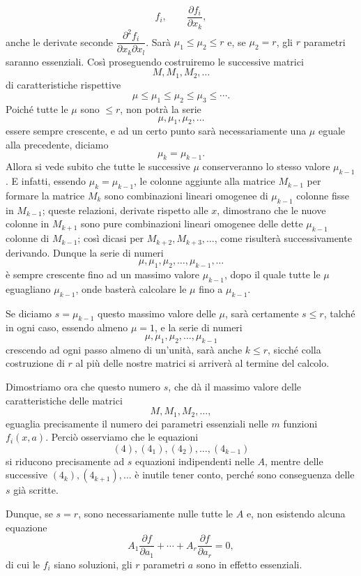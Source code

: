 \documentclass[11pt]{book}
\begin{document}
\[
 f_i,\qquad \frac{\partial f_i}{\partial x_k},
\]
anche le derivate seconde $\dfrac{\partial^2 f_i}{\partial x_k\partial x_l}$. Sarà $\mu_1\le\mu_2\le r$ e, se $\mu_2=r$, gli $r$ parametri saranno essenziali. Così proseguendo costruiremo le successive matrici
\[
 M,
 M_1,
 M_2,
 \ldots
\]
di caratteristiche rispettive
\[
 \mu\le\mu_1\le\mu_2\le\mu_3\le\cdots .
\]
Poiché tutte le $\mu$ sono $\le r$, non potrà la serie
\[
 \mu,\mu_1,\mu_2,\ldots
\]
essere sempre crescente, e ad un certo punto sarà necessariamente una $\mu$ eguale alla precedente, diciamo
\[
 \mu_k=\mu_{k-1}.
\]
Allora si vede subito che tutte le successive $\mu$ conserveranno lo stesso valore $\mu_{k-1}$. E infatti, essendo $\mu_k=\mu_{k-1}$, le colonne aggiunte alla matrice $M_{k-1}$ per formare la matrice $M_k$ sono combinazioni lineari omogenee di $\mu_{k-1}$ colonne fisse in $M_{k-1}$; queste relazioni, derivate rispetto alle $x$, dimostrano che le nuove colonne in $M_{k+1}$ sono pure combinazioni lineari omogenee delle dette $\mu_{k-1}$ colonne di $M_{k-1}$; così dicasi per $M_{k+2},M_{k+3},\ldots$, come risulterà successivamente derivando. Dunque la serie di numeri
\[
 \mu,\mu_1,\mu_2,\ldots,\mu_{k-1},\ldots
\]
è sempre crescente fino ad un massimo valore $\mu_{k-1}$, dopo il quale tutte le $\mu$ eguagliano $\mu_{k-1}$, onde basterà calcolare le $\mu$ fino a $\mu_{k-1}$.

Se diciamo $s=\mu_{k-1}$ questo massimo valore delle $\mu$, sarà certamente $s\le r$, talché in ogni caso, essendo almeno $\mu=1$, e la serie di numeri
\[
 \mu,\mu_1,\mu_2,\ldots,\mu_{k-1}
\]
crescendo ad ogni passo almeno di un'unità, sarà anche $k\le r$, sicché colla costruzione di $r$ al più delle nostre matrici si arriverà al termine del calcolo.

Dimostriamo ora che questo numero $s$, che dà il massimo valore delle caratteristiche delle matrici
\[
 M,M_1,M_2,\ldots,
\]
eguaglia precisamente il numero dei parametri essenziali nelle $m$ funzioni $f_i(x,a)$. Perciò osserviamo che le equazioni
\[
 (4),(4_1),(4_2),\ldots,(4_{k-1})
\]
si riducono precisamente ad $s$ equazioni indipendenti nelle $A$, mentre delle successive $(4_k),(4_{k+1}),\ldots$ è inutile tener conto, perché sono conseguenza delle $s$ già scritte.

Dunque, se $s=r$, sono necessariamente nulle tutte le $A$ e, non esistendo alcuna equazione
\[
 A_1\frac{\partial f}{\partial a_1}+\cdots+A_r\frac{\partial f}{\partial a_r}=0,
\]
di cui le $f_i$ siano soluzioni, gli $r$ parametri $a$ sono in effetto essenziali.
\end{document}
